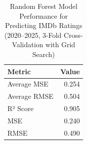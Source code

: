 \begin{table}
\caption{Random Forest Model Performance for Predicting IMDb Ratings (2020--2025, 3-Fold Cross-Validation with Grid Search)}
\label{tab:rf_results}
\begin{tabular}{lr}
\toprule
Metric & Value \\
\midrule
Average MSE  & 0.254 \\
Average RMSE & 0.504 \\
R² Score & 0.905 \\
MSE & 0.240 \\
RMSE & 0.490 \\
\bottomrule
\end{tabular}
\end{table}
